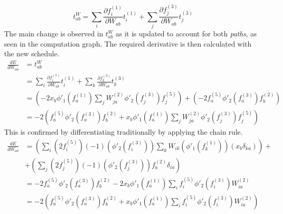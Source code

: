 \documentclass[fleqn]{report}
\begin{document}
\begin{equation}
    t^{W}_{ab} = \sum_i \frac{\partial f^{(1)}_i}{\partial W_{ab}} t^{(1)}_i + \sum_j \frac{\partial f^{(3)}_j}{\partial W_{ab}} t^{(3)}_j
\end{equation}
The main change is observed in $t^{W}_{ab}$ as it is updated to account for both \textit{paths}, as seen in the computation graph. The required derivative is then calculated with the new schedule.
\begin{equation}
    \begin{split}
        \frac{d E}{d W_{ab}} & = t^{W}_{ab} \\
        & = \sum_i \frac{\partial f^{(1)}_i}{\partial W_{ab}} t^{(1)}_i + \sum_k \frac{\partial f^{(3)}_k}{\partial W_{ab}} t^{(3)}_k \\
        & =
        \left( - 2 x_b \phi'_1 \left ( f^{(1)}_a \right ) \sum_j W^{(2)}_{ja} \phi'_2 \left ( f^{(3)}_j \right ) f^{(5)}_j \right) +
        \left( - 2 f^{(5)}_a \phi'_2 \left ( f^{(3)}_a \right ) f^{(2)}_b \right) \\
        & = -2 \left (f^{(5)}_a \phi'_2\left(f^{(3)}_a \right ) f^{(2)}_b + x_b \phi'_1 \left ( f^{(1)}_a \right ) \sum_j W^{(2)}_{ja} \phi'_2 \left ( f^{(3)}_j \right ) f^{(5)}_j \right )
    \end{split}
\end{equation}
This is confirmed by differentiating traditionally by applying the chain rule.
\begin{equation}
    \begin{split}
        \frac{d E}{d W_{ab}} & =
        \left ( \sum_i \left ( 2 f^{(5)}_i \right ) \left ( -1 \right ) \left ( \phi'_2 \left ( f^{(3)}_i \right ) \right ) \sum_k W_{ik} \left ( \phi'_1 \left ( f^{(1)}_k \right ) \right ) \left ( x_b \delta_{ka} \right ) \right ) + \\
        & + \left ( \sum_j \left ( 2 f^{(5)}_j \right ) \left ( -1 \right ) \left ( \phi'_2 \left ( f^{(3)}_j \right ) \right ) f^{(2)}_b \delta_{ia} \right ) \\
        & = - 2 f^{(5)}_a \phi'_2 \left ( f^{(3)}_a \right ) f^{(2)}_b - 2 x_b \phi'_1 \left (f^{(1)}_a \right ) \sum_i f^{(5)}_i \phi'_2 \left ( f^{(3)}_i \right ) W^{(2)}_{ia} \\
        & = - 2 \left ( f^{(5)}_a \phi'_2 \left ( f^{(3)}_a \right ) f^{(2)}_b + x_b \phi'_1 \left (f^{(1)}_a \right ) \sum_i f^{(5)}_i \phi'_2 \left ( f^{(3)}_i \right ) W^{(2)}_{ia} \right )
    \end{split}
\end{equation}
\end{document}
